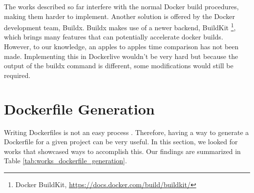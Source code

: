 The works described so far interfere with the normal Docker build procedures, making them harder to implement. Another solution is offered by the Docker development team, Buildx. Buildx makes use of a newer backend, BuildKit \footnote{Docker BuildKit, \url{https://docs.docker.com/build/buildkit/}}, which brings many features that can potentially accelerate docker builds. However, to our knowledge, an apples to apples time comparison has not been made. Implementing this in Dockerlive wouldn't be very hard but because the output of the buildx command is different, some modifications would still be required.

\section{Dockerfile Generation} \label{sec:dockerfile_generation}

Writing Dockerfiles is not an easy process \cite{reisDevelopingDockerDockerCompose2022}. Therefore, having a way to generate a Dockerfile for a given project can be very useful. In this section, we looked for works that showcased ways to accomplish this. Our findings are summarized in Table \ref{tab:works_dockerfile_generation}.



